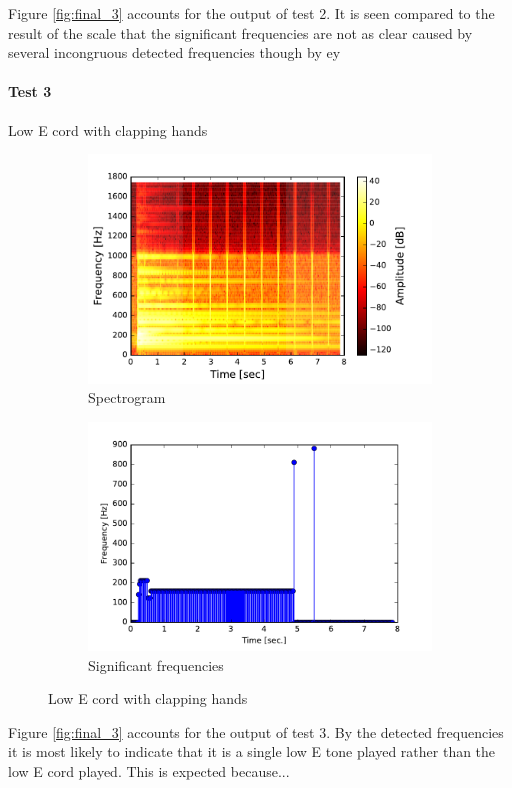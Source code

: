 Figure \ref{fig:final_3} accounts for the output of test 2. It is seen compared to the result of the scale that the significant frequencies are not as clear caused by several incongruous detected frequencies though by ey         

\paragraph{Test 3} Low E cord with clapping hands
\begin{figure}[H]
\centering
\begin{subfigure}{0.49\textwidth}
\centering
\includegraphics[width=\textwidth]{figures/validation/systemtest/final_spec2.pdf}
\caption{Spectrogram}
\label{fig:final_spec2}
\end{subfigure}
\begin{subfigure}{0.49\textwidth}
\centering
\includegraphics[width=\textwidth]{figures/validation/systemtest/final_peak2.pdf}
\caption{Significant frequencies}
\label{fig:final_peak2}
\end{subfigure}
\label{fig:final_2}
\caption{Low E cord with clapping hands}
\end{figure}  

Figure \ref{fig:final_3} accounts for the output of test 3. By the detected frequencies it is most likely to indicate that it is a single low E tone played rather than the low E cord played. This is expected because...  

\subsection{}